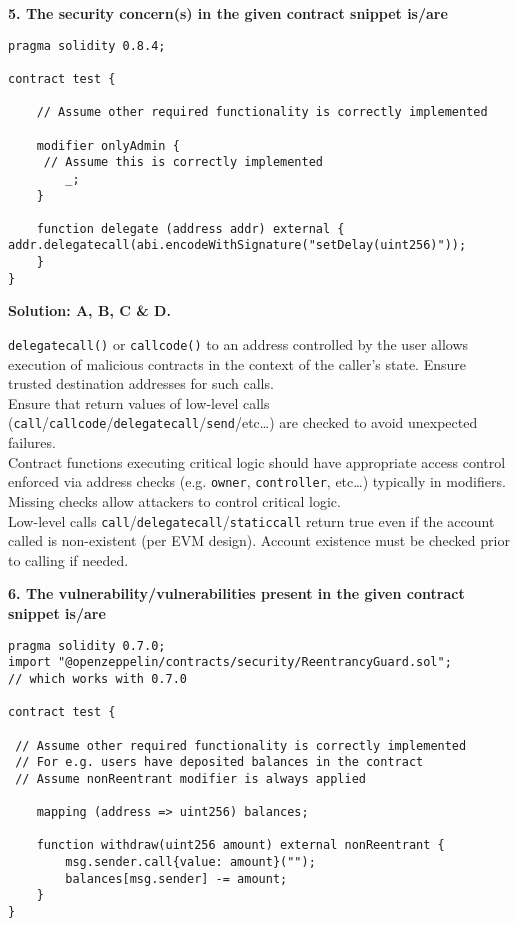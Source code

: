 \pagebreak

\textbf{5. The security concern(s) in the given contract snippet is/are}\label{sec:exam4_q5}

\begin{lstlisting}[language=Solidity, style=solStyle]
pragma solidity 0.8.4;

contract test {

    // Assume other required functionality is correctly implemented

    modifier onlyAdmin {
     // Assume this is correctly implemented
        _;
    }

    function delegate (address addr) external {  addr.delegatecall(abi.encodeWithSignature("setDelay(uint256)"));
    }
}
\end{lstlisting}

\textbf{Solution: A, B, C \& D.}

\verb|delegatecall()| or \verb|callcode()| to an address controlled by the user allows execution of malicious contracts in the context of the caller's state.
Ensure trusted destination addresses for such calls.\\

Ensure that return values of low-level calls (\verb|call|/\verb|callcode|/\verb|delegatecall|\linebreak /\verb|send|/etc\dots) are checked to avoid unexpected failures.\\

Contract functions executing critical logic should have appropriate access control enforced via address checks (e.g. \verb|owner|, \verb|controller|, etc\dots) typically in modifiers.
Missing checks allow attackers to control critical logic.\\

Low-level calls \verb|call|/\verb|delegatecall|/\verb|staticcall| return true even if the account called is non-existent (per EVM design).
Account existence must be checked prior to calling if needed.\\

\pagebreak

\textbf{6. The vulnerability/vulnerabilities present in the given contract snippet is/are}\label{sec:exam4_q6}\\

\begin{lstlisting}[language=Solidity, style=solStyle]
pragma solidity 0.7.0;
import "@openzeppelin/contracts/security/ReentrancyGuard.sol";
// which works with 0.7.0

contract test {

 // Assume other required functionality is correctly implemented
 // For e.g. users have deposited balances in the contract
 // Assume nonReentrant modifier is always applied

    mapping (address => uint256) balances;

    function withdraw(uint256 amount) external nonReentrant {
        msg.sender.call{value: amount}("");
        balances[msg.sender] -= amount;
    }
}
\end{lstlisting}


